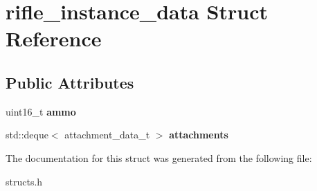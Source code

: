 \hypertarget{structrifle__instance__data}{}\section{rifle\+\_\+instance\+\_\+data Struct Reference}
\label{structrifle__instance__data}
\subsection*{Public Attributes}
\begin{DoxyCompactItemize}
\item 
\mbox{\label{structrifle__instance__data_a77a05262f2c57b40751cba747a1ed091}} 
uint16\+\_\+t {\bfseries ammo}
\item 
\mbox{\label{structrifle__instance__data_ac650c4d2b69e76e2cb3c241fdc4360ad}} 
std\+::deque$<$ attachment\+\_\+data\+\_\+t $>$ {\bfseries attachments}
\end{DoxyCompactItemize}


The documentation for this struct was generated from the following file\+:\begin{DoxyCompactItemize}
\item 
structs.\+h\end{DoxyCompactItemize}
